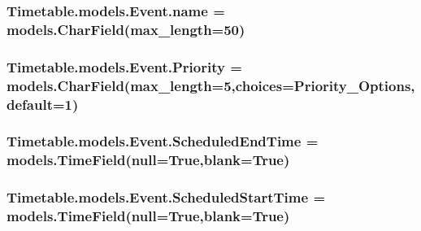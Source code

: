 \subsubsection[{\texorpdfstring{name}{name}}]{\setlength{\rightskip}{0pt plus 5cm}Timetable.\+models.\+Event.\+name = models.\+Char\+Field(max\+\_\+length=50)\hspace{0.3cm}{\ttfamily [static]}}\hypertarget{classTimetable_1_1models_1_1Event_a774e00d377c679749ab116b28816529b}{}\label{classTimetable_1_1models_1_1Event_a774e00d377c679749ab116b28816529b}
\subsubsection[{\texorpdfstring{Priority}{Priority}}]{\setlength{\rightskip}{0pt plus 5cm}Timetable.\+models.\+Event.\+Priority = models.\+Char\+Field(max\+\_\+length=5,choices={\bf Priority\+\_\+\+Options},default=\textquotesingle{}1\textquotesingle{})\hspace{0.3cm}{\ttfamily [static]}}\hypertarget{classTimetable_1_1models_1_1Event_a2d4e6e1819ff670b068418c7e7f9b030}{}\label{classTimetable_1_1models_1_1Event_a2d4e6e1819ff670b068418c7e7f9b030}
\subsubsection[{\texorpdfstring{Scheduled\+End\+Time}{ScheduledEndTime}}]{\setlength{\rightskip}{0pt plus 5cm}Timetable.\+models.\+Event.\+Scheduled\+End\+Time = models.\+Time\+Field(null=True,blank=True)\hspace{0.3cm}{\ttfamily [static]}}\hypertarget{classTimetable_1_1models_1_1Event_a9db70fd3edf6430e290f7a1da2f79a3d}{}\label{classTimetable_1_1models_1_1Event_a9db70fd3edf6430e290f7a1da2f79a3d}
\subsubsection[{\texorpdfstring{Scheduled\+Start\+Time}{ScheduledStartTime}}]{\setlength{\rightskip}{0pt plus 5cm}Timetable.\+models.\+Event.\+Scheduled\+Start\+Time = models.\+Time\+Field(null=True,blank=True)\hspace{0.3cm}{\ttfamily [static]}}\hypertarget{classTimetable_1_1models_1_1Event_a8474acb2f5ed92f0eb0bb53396faa095}{}\label{classTimetable_1_1models_1_1Event_a8474acb2f5ed92f0eb0bb53396faa095}
